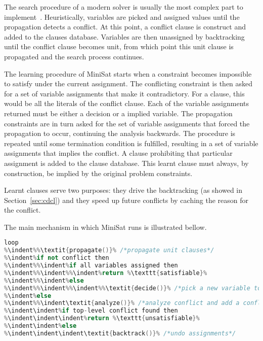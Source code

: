 The search procedure of a modern solver is usually the most complex part to
implement~\cite{een2003extensible}. Heuristically, variables are picked and
assigned values until the propagation detects a conflict. At this point, a
conflict clause is construct and added to the clauses database. Variables are
then unassigned by backtracking until the conflict clause becomes unit, from
which point this unit clause is propagated and the search process continues.

The learning procedure of MiniSat starts when a constraint becomes impossible to
satisfy under the current assignment. The conflicting constraint is then asked
for a set of variable assignments that make it contradictory. For a clause, this
would be all the literals of the conflict clause. Each of the variable
assignments returned must be either a decision or a implied variable. The
propagation constraints are in turn asked for the set of variable assignments
that forced the propagation to occur, continuing the analysis backwards. The
procedure is repeated until some termination condition is fulfilled, resulting
in a set of variable assignments that implies the conflict. A clause prohibiting
that particular assignment is added to the clause database. This learnt clause
must always, by construction, be implied by the original problem constraints.

Learnt clauses serve two purposes: they drive the backtracking (as showed in
Section~\ref{sec:cdcl}) and they speed up future conflicts by caching the reason
for the conflict. 

The main mechanism in which MiniSat runs is illustrated bellow.

\begin{lstlisting}[frame=single, language=C++,morekeywords={var,loop,then,lit},escapechar=\%,
commentstyle=\color{gray},deletekeywords={not}]
loop
%\indent%%\textit{propagate()}% /*propagate unit clauses*/
%\indent%if not conflict then
%\indent%%\indent%if all variables assigned then
%\indent%%\indent%%\indent%return %\texttt{satisfiable}%
%\indent%%\indent%else
%\indent%%\indent%%\indent%%\textit{decide()}% /*pick a new variable to assign a value*/ 
%\indent%else
%\indent%%\indent\textit{analyze()}% /*analyze conflict and add a conflict clause*/
%\indent\indent%if top-level conflict found then
%\indent\indent\indent%return %\texttt{unsatisfiable}%
%\indent\indent%else
%\indent\indent\indent\textit{backtrack()}% /*undo assignments*/
\end{lstlisting}


